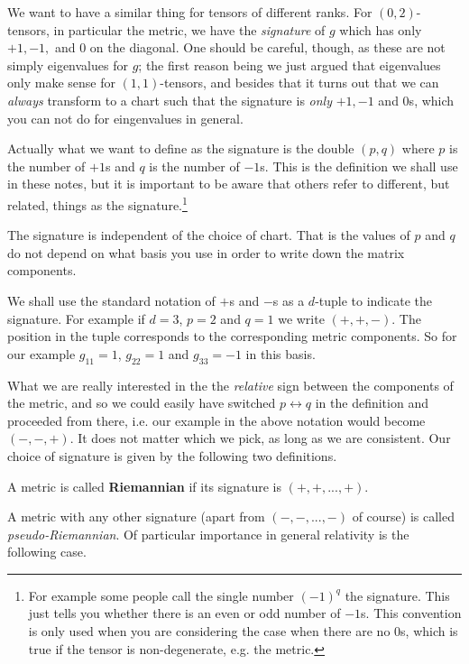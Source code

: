 We want to have a similar thing for tensors of different ranks. For $(0,2)$-tensors, in particular the metric, we have the \textit{signature} of $g$ which has only $+1,-1,$ and $0$ on the diagonal. One should be careful, though, as these are not simply eigenvalues for $g$; the first reason being we just argued that eigenvalues only make sense for $(1,1)$-tensors, and besides that it turns out that we can \textit{always} transform to a chart such that the signature is \textit{only} $+1,-1$ and $0$s, which you can not do for eingenvalues in general. 

Actually what we want to define as the signature is the double $(p,q)$ where $p$ is the number of $+1$s and $q$ is the number of $-1$s. This is the definition we shall use in these notes, but it is important to be aware that others refer to different, but related, things as the signature.\footnote{For example some people call the single number $(-1)^q$ the signature. This just tells you whether there is an even or odd number of $-1$s. This convention is only used when you are considering the case when there are no $0$s, which is true if the tensor is non-degenerate, e.g. the metric.}

\bcl 
    The signature is independent of the choice of chart. That is the values of $p$ and $q$ do not depend on what basis you use in order to write down the matrix components.
\ecl 

\bnn 
    We shall use the standard notation of $+$s and $-$s as a $d$-tuple to indicate the signature. For example if $d=3$, $p=2$ and $q=1$ we write $(+,+,-)$. The position in the tuple corresponds to the corresponding metric components. So for our example $g_{11}=1$, $g_{22}=1$ and $g_{33}=-1$ in this basis. 
\enn 

\br 
\label{rem:SignatureRelativeSign}
    What we are really interested in the the \textit{relative} sign between the components of the metric, and so we could easily have switched $p\leftrightarrow q$ in the definition and proceeded from there, i.e. our example in the above notation would become $(-,-,+)$. It does not matter which we pick, as long as we are consistent. Our choice of signature is given by the following two definitions. 
\er 

    A metric is called \textbf{Riemannian} if its signature is $(+,+,...,+)$.
\ed

A metric with any other signature (apart from $(-,-,...,-)$ of course) is called \textit{pseudo-Riemannian}. Of particular importance in general relativity is the following case.


